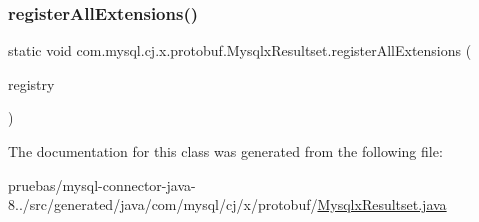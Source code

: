 \subsubsection{\texorpdfstring{register\+All\+Extensions()}{registerAllExtensions()}}
{\footnotesize\ttfamily static void com.\+mysql.\+cj.\+x.\+protobuf.\+Mysqlx\+Resultset.\+register\+All\+Extensions (\begin{DoxyParamCaption}\item[{com.\+google.\+protobuf.\+Extension\+Registry}]{registry }\end{DoxyParamCaption})\hspace{0.3cm}{\ttfamily [static]}}



The documentation for this class was generated from the following file\+:\begin{DoxyCompactItemize}
\item 
pruebas/mysql-\/connector-\/java-\/8../src/generated/java/com/mysql/cj/x/protobuf/\mbox{\hyperlink{_mysqlx_resultset_8java}{Mysqlx\+Resultset.\+java}}\end{DoxyCompactItemize}
